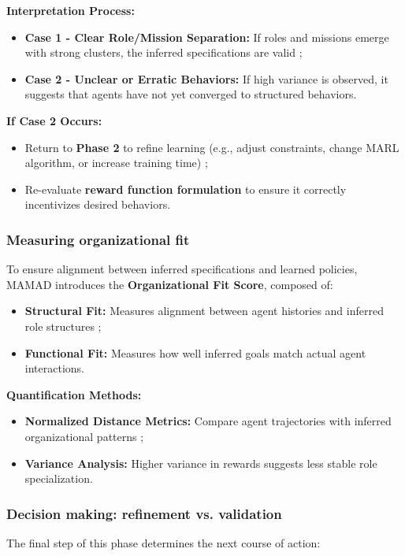\documentclass[pdflatex,sn-mathphys-num]{sn-jnl}%
\theoremstyle{thmstyleone}%
\theoremstyle{thmstyletwo}%
\theoremstyle{thmstylethree}%
\begin{document}
\noindent \textbf{Interpretation Process:}
\begin{itemize}
    \item \textbf{Case 1 - Clear Role/Mission Separation:} If roles and missions emerge with strong clusters, the inferred specifications are valid ;
    \item \textbf{Case 2 - Unclear or Erratic Behaviors:} If high variance is observed, it suggests that agents have not yet converged to structured behaviors.
\end{itemize}

\noindent \textbf{If Case 2 Occurs:}
\begin{itemize}
    \item Return to \textbf{Phase 2} to refine learning (e.g., adjust constraints, change MARL algorithm, or increase training time) ;
    \item Re-evaluate \textbf{reward function formulation} to ensure it correctly incentivizes desired behaviors.
\end{itemize}

\subsubsection{Measuring organizational fit}
To ensure alignment between inferred specifications and learned policies, MAMAD introduces the \textbf{Organizational Fit Score}, composed of:

\begin{itemize}
    \item \textbf{Structural Fit:} Measures alignment between agent histories and inferred role structures ;
    \item \textbf{Functional Fit:} Measures how well inferred goals match actual agent interactions.
\end{itemize}

\noindent \textbf{Quantification Methods:}
\begin{itemize}
    \item \textbf{Normalized Distance Metrics:} Compare agent trajectories with inferred organizational patterns ;
    \item \textbf{Variance Analysis:} Higher variance in rewards suggests less stable role specialization.
\end{itemize}

\subsubsection{Decision making: refinement vs. validation}
The final step of this phase determines the next course of action:
\end{document}
